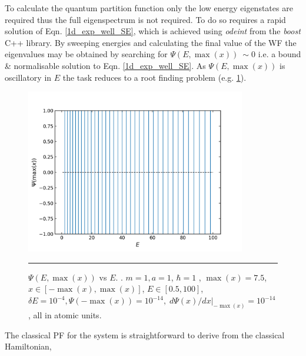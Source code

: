 \documentclass[../main.tex]{subfiles}
\begin{document}
To calculate the quantum partition function only the low energy eigenstates are required thus the full eigenspectrum is not required. To do so requires a rapid solution of Eqn. \eqref{1d_exp_well_SE}, which is achieved using \emph{odeint} from the \emph{boost} C++ library.\cite{Ahnert2011} By sweeping energies and calculating the final value of the WF the eigenvalues may be obtained by searching for $\Psi(E, \max(x)) \ \sim 0$ i.e. a bound \& normalisable solution to Eqn. \eqref{1d_exp_well_SE}. As $\Psi(E, \max(x))$ is oscillatory in $E$ the task reduces to a root finding problem (e.g. \figurename{ \ref{1d_exp_well_psi_max_vs_energy}}).

\begin{figure}[h!]
	\centering
	\includegraphics[height=7.2cm]{4/figs/1d_exp_well_psi_max_vs_energy}
	\vspace{0.2cm}
	\hrule
	\caption{$\Psi(E, \max(x))$ vs $E$. . $m=1, a = 1$, $\hbar = 1$ , $\max(x) = 7.5$, $x \in [-\max(x), \max(x)]$, $E \in [0.5, 100]$, $\delta E = 10^{-4}, \Psi(-\!\max(x)) = 10^{-14},\; d\Psi(x)/dx|_{-\!\max(x)} = 10^{-14}$, all in atomic units.} 
	\label{1d_exp_well_psi_max_vs_energy}
\end{figure}
\newpage
The classical PF for the system is straightforward to derive from the classical Hamiltonian,
\end{document}
